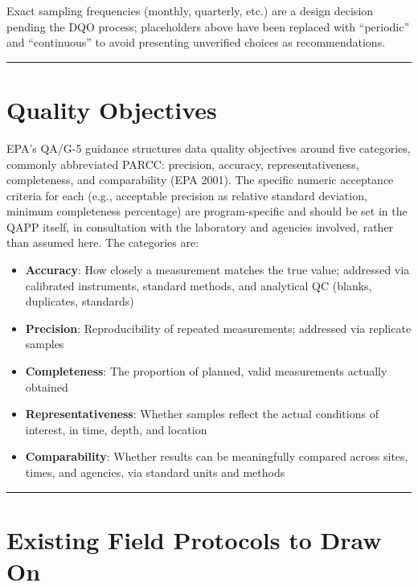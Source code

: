 \documentclass[
  letterpaper,
]{scrbook}
\providecommand{\tightlist}{%
  \setlength{\itemsep}{0pt}\setlength{\parskip}{0pt}}\usepackage{longtable,booktabs,array}
\begin{document}
Exact sampling frequencies (monthly, quarterly, etc.) are a design
decision pending the DQO process; placeholders above have been replaced
with ``periodic'' and ``continuous'' to avoid presenting unverified
choices as recommendations.

\begin{center}\rule{0.5\linewidth}{0.5pt}\end{center}

\section{Quality Objectives}\label{quality-objectives}

EPA's QA/G-5 guidance structures data quality objectives around five
categories, commonly abbreviated PARCC: precision, accuracy,
representativeness, completeness, and comparability (EPA 2001). The
specific numeric acceptance criteria for each (e.g., acceptable
precision as relative standard deviation, minimum completeness
percentage) are program-specific and should be set in the QAPP itself,
in consultation with the laboratory and agencies involved, rather than
assumed here. The categories are:

\begin{itemize}
\tightlist
\item
  \textbf{Accuracy}: How closely a measurement matches the true value;
  addressed via calibrated instruments, standard methods, and analytical
  QC (blanks, duplicates, standards)
\item
  \textbf{Precision}: Reproducibility of repeated measurements;
  addressed via replicate samples
\item
  \textbf{Completeness}: The proportion of planned, valid measurements
  actually obtained
\item
  \textbf{Representativeness}: Whether samples reflect the actual
  conditions of interest, in time, depth, and location
\item
  \textbf{Comparability}: Whether results can be meaningfully compared
  across sites, times, and agencies, via standard units and methods
\end{itemize}

\begin{center}\rule{0.5\linewidth}{0.5pt}\end{center}

\section{Existing Field Protocols to Draw
On}\label{existing-field-protocols-to-draw-on}
\end{document}
